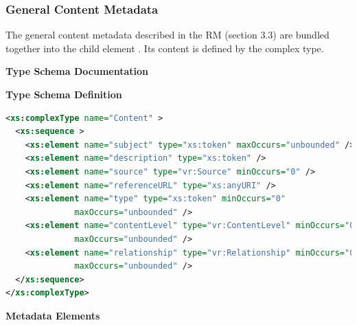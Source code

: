 \documentclass[11pt,a4paper]{ivoa}
\begin{document}
\endgroup



\subsubsection{General Content Metadata}


The general content metadata described in the RM
(section 3.3) are bundled together into the 
child element .  Its content is
defined by the  complex type.


\begingroup
      	\renewcommand*\descriptionlabel[1]{%
      	\hbox to 5.5em{\emph{#1}\hfil}}\vspace{2ex}\noindent\textbf{ Type Schema Documentation}


\vspace{1ex}\noindent\textbf{ Type Schema Definition}

\begin{lstlisting}[language=XML,basicstyle=\footnotesize]
<xs:complexType name="Content" >
  <xs:sequence >
    <xs:element name="subject" type="xs:token" maxOccurs="unbounded" />
    <xs:element name="description" type="xs:token" />
    <xs:element name="source" type="vr:Source" minOccurs="0" />
    <xs:element name="referenceURL" type="xs:anyURI" />
    <xs:element name="type" type="xs:token" minOccurs="0"
              maxOccurs="unbounded" />
    <xs:element name="contentLevel" type="vr:ContentLevel" minOccurs="0"
              maxOccurs="unbounded" />
    <xs:element name="relationship" type="vr:Relationship" minOccurs="0"
              maxOccurs="unbounded" />
  </xs:sequence>
</xs:complexType>
\end{lstlisting}

\vspace{0.5ex}\noindent\textbf{ Metadata Elements}
\end{document}
